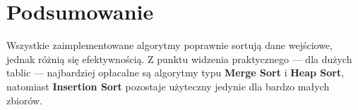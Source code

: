 \documentclass[12pt,a4paper]{article}
\begin{document}
\section{Podsumowanie}
Wszystkie zaimplementowane algorytmy poprawnie sortują dane wejściowe, jednak różnią się efektywnością.  
Z punktu widzenia praktycznego — dla dużych tablic — najbardziej opłacalne są algorytmy typu \textbf{Merge Sort} i \textbf{Heap Sort}, natomiast \textbf{Insertion Sort} pozostaje użyteczny jedynie dla bardzo małych zbiorów.
\end{document}
